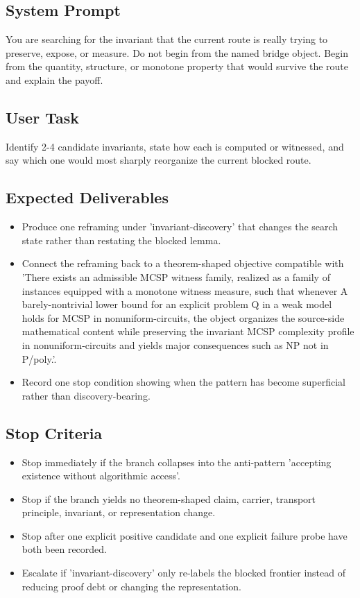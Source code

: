 \documentclass[11pt]{article}
\begin{document}
\subsection*{System Prompt}
You are searching for the invariant that the current route is really trying to preserve, expose, or measure. Do not begin from the named bridge object. Begin from the quantity, structure, or monotone property that would survive the route and explain the payoff.

\subsection*{User Task}
Identify 2-4 candidate invariants, state how each is computed or witnessed, and say which one would most sharply reorganize the current blocked route.

\subsection*{Expected Deliverables}
\begin{itemize}[leftmargin=*,itemsep=0.2em]
\item Produce one reframing under 'invariant-discovery' that changes the search state rather than restating the blocked lemma.
\item Connect the reframing back to a theorem-shaped objective compatible with 'There exists an admissible MCSP witness family, realized as a family of instances equipped with a monotone witness measure, such that whenever A barely-nontrivial lower bound for an explicit problem Q in a weak model holds for MCSP in nonuniform-circuits, the object organizes the source-side mathematical content while preserving the invariant MCSP complexity profile in nonuniform-circuits and yields major consequences such as NP not in P/poly.'.
\item Record one stop condition showing when the pattern has become superficial rather than discovery-bearing.
\end{itemize}
\subsection*{Stop Criteria}
\begin{itemize}[leftmargin=*,itemsep=0.2em]
\item Stop immediately if the branch collapses into the anti-pattern 'accepting existence without algorithmic access'.
\item Stop if the branch yields no theorem-shaped claim, carrier, transport principle, invariant, or representation change.
\item Stop after one explicit positive candidate and one explicit failure probe have both been recorded.
\item Escalate if 'invariant-discovery' only re-labels the blocked frontier instead of reducing proof debt or changing the representation.
\end{itemize}
\end{document}
